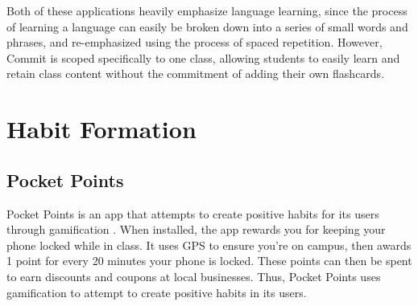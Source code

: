 \par Both of these applications heavily emphasize language learning, since the process of learning a language can easily be broken down into a series of small words and phrases, and re-emphasized using the process of spaced repetition. However, Commit is scoped specifically to one class, allowing students to easily learn and retain class content without the commitment of adding their own flashcards.



\section{Habit Formation}

\subsection{Pocket Points}
\par Pocket Points is an app that attempts to create positive habits for its users through gamification \cite{pocketpoints}. When installed, the app rewards you for keeping your phone locked while in class. It uses GPS to ensure you're on campus, then awards 1 point for every 20 minutes your phone is locked. These points can then be spent to earn discounts and coupons at local businesses. Thus, Pocket Points uses gamification to attempt to create positive habits in its users.


